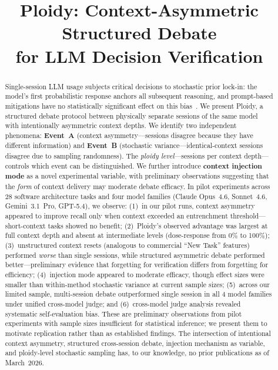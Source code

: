 \documentclass{article}
\title{Ploidy: Context-Asymmetric Structured Debate\\for LLM Decision Verification}
\begin{document}
\maketitle

\begin{abstract}
Single-session LLM usage subjects critical decisions to stochastic prior lock-in: the model's first probabilistic response anchors all subsequent reasoning, and prompt-based mitigations have no statistically significant effect on this bias~\citep{feng2026anchoring}. We present Ploidy, a structured debate protocol between physically separate sessions of the same model with intentionally asymmetric context depths. We identify two independent phenomena: \textbf{Event~A} (context asymmetry---sessions disagree because they have different information) and \textbf{Event~B} (stochastic variance---identical-context sessions disagree due to sampling randomness). The \emph{ploidy level}---sessions per context depth---controls which event can be distinguished. We further introduce \textbf{context injection mode} as a novel experimental variable, with preliminary observations suggesting that the \emph{form} of context delivery may moderate debate efficacy. In pilot experiments across 28 software architecture tasks and four model families (Claude Opus~4.6, Sonnet~4.6, Gemini~3.1~Pro, GPT-5.4), we observe: (1)~in our pilot runs, context asymmetry appeared to improve recall only when context exceeded an entrenchment threshold---short-context tasks showed no benefit; (2)~Ploidy's observed advantage was largest at full context depth and absent at intermediate levels (dose-response from 0\% to 100\%); (3)~unstructured context resets (analogous to commercial ``New Task'' features) performed \emph{worse} than single sessions, while structured asymmetric debate performed better---preliminary evidence that forgetting for verification differs from forgetting for efficiency; (4)~injection mode appeared to moderate efficacy, though effect sizes were smaller than within-method stochastic variance at current sample sizes; (5)~across our limited sample, multi-session debate outperformed single session in all 4 model families under unified cross-model judge; and (6)~cross-model judge analysis revealed systematic self-evaluation bias. These are preliminary observations from pilot experiments with sample sizes insufficient for statistical inference; we present them to motivate replication rather than as established findings. The intersection of intentional context asymmetry, structured cross-session debate, injection mechanism as variable, and ploidy-level stochastic sampling has, to our knowledge, no prior publications as of March~2026.
\end{abstract}
\end{document}
